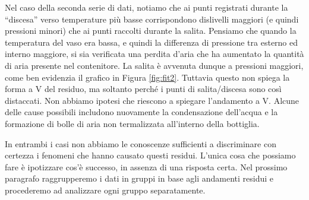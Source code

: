Nel caso della seconda serie di dati, notiamo che ai punti registrati durante la ``discesa'' verso temperature più basse
corrispondono dislivelli maggiori (e quindi pressioni minori) che ai punti raccolti durante la salita. Pensiamo che quando
la temperatura del vaso era bassa, e quindi la differenza di pressione tra esterno ed interno maggiore, si sia verificata una perdita d'aria
che ha aumentato la quantità di aria presente nel contenitore. La salita è avvenuta dunque a pressioni maggiori, come
ben evidenzia il grafico in Figura \ref{fig:fit2}. Tuttavia questo non spiega la forma a V del residuo, ma soltanto perché i punti
di salita/discesa sono così distaccati. Non abbiamo ipotesi che riescono a spiegare l'andamento a V. Alcune delle cause possibili
includono nuovamente la condensazione dell'acqua e la formazione di bolle di aria non termalizzata all'interno della bottiglia.

In entrambi i casi non abbiamo le conoscenze sufficienti a discriminare con certezza i fenomeni che hanno causato questi residui.
L'unica cosa che possiamo fare è ipotizzare cos'è successo, in assenza di una risposta certa. Nel prossimo paragrafo raggrupperemo i dati
in gruppi in base agli andamenti residui e procederemo ad analizzare ogni gruppo separatamente.


